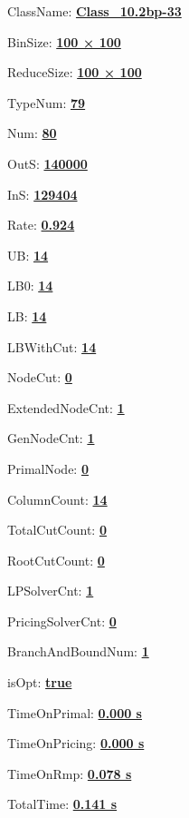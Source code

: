 \documentclass[11pt]{article}
\begin{document}
\pagestyle{empty}


ClassName: \underline{\textbf{Class_10.2bp-33}}
\par
BinSize: \underline{\textbf{100 × 100}}
\par
ReduceSize: \underline{\textbf{100 × 100}}
\par
TypeNum: \underline{\textbf{79}}
\par
Num: \underline{\textbf{80}}
\par
OutS: \underline{\textbf{140000}}
\par
InS: \underline{\textbf{129404}}
\par
Rate: \underline{\textbf{0.924}}
\par
UB: \underline{\textbf{14}}
\par
LB0: \underline{\textbf{14}}
\par
LB: \underline{\textbf{14}}
\par
LBWithCut: \underline{\textbf{14}}
\par
NodeCut: \underline{\textbf{0}}
\par
ExtendedNodeCnt: \underline{\textbf{1}}
\par
GenNodeCnt: \underline{\textbf{1}}
\par
PrimalNode: \underline{\textbf{0}}
\par
ColumnCount: \underline{\textbf{14}}
\par
TotalCutCount: \underline{\textbf{0}}
\par
RootCutCount: \underline{\textbf{0}}
\par
LPSolverCnt: \underline{\textbf{1}}
\par
PricingSolverCnt: \underline{\textbf{0}}
\par
BranchAndBoundNum: \underline{\textbf{1}}
\par
isOpt: \underline{\textbf{true}}
\par
TimeOnPrimal: \underline{\textbf{0.000 s}}
\par
TimeOnPricing: \underline{\textbf{0.000 s}}
\par
TimeOnRmp: \underline{\textbf{0.078 s}}
\par
TotalTime: \underline{\textbf{0.141 s}}
\par
\newpage


\end{document}
